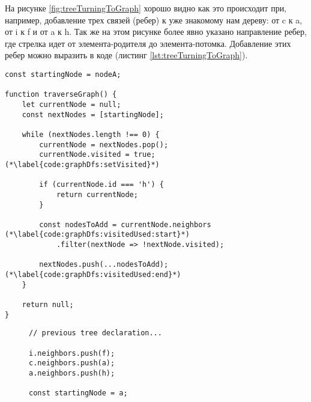 \documentclass[../../article.tex]{subfiles}
\begin{document}
На рисунке \ref{fig:treeTurningToGraph} хорошо видно как это происходит при, например, добавление трех связей (ребер) к уже знакомому нам дереву: от {\firacodebold c} к {\firacodebold a}, от {\firacodebold i} к {\firacodebold f} и от {\firacodebold a} к {\firacodebold h}. Так же на этом рисунке более явно указано направление ребер, где стрелка идет от элемента-родителя до элемента-потомка. Добавление этих ребер можно выразить в коде (листинг \ref{lst:treeTurningToGraph}).

\begin{figure*}
    \begin{ruledelement}
        \begin{lstlisting}[caption={Обход графа в глубину}, label={lst:graphDfs}]
const startingNode = nodeA;

function traverseGraph() {
    let currentNode = null;
    const nextNodes = [startingNode];

    while (nextNodes.length !== 0) {
        currentNode = nextNodes.pop();
        currentNode.visited = true; (*\label{code:graphDfs:setVisited}*)

        if (currentNode.id === 'h') {
            return currentNode;
        }

        const nodesToAdd = currentNode.neighbors (*\label{code:graphDfs:visitedUsed:start}*)
            .filter(nextNode => !nextNode.visited);

        nextNodes.push(...nodesToAdd); (*\label{code:graphDfs:visitedUsed:end}*)
    }

    return null;
}
        \end{lstlisting}
    \end{ruledelement}

\end{figure*}

\begin{figure}
    \begin{ruledelement}
        \begin{lstlisting}[caption={Добавление связей превращающих дерево в грфа}, label={lst:treeTurningToGraph}]
// previous tree declaration...

i.neighbors.push(f);
c.neighbors.push(a);
a.neighbors.push(h);

const startingNode = a;
        \end{lstlisting}
    \end{ruledelement}
\end{figure}
\end{document}

